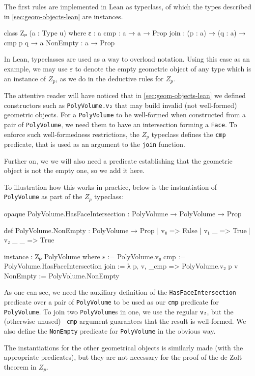 \documentclass[12pt]{article} %
\newcommand{\leanline}[1]{\texttt{#1}} %
\newcommand{\face}{\texttt{Face}} %
\newcommand{\pvolume}{\texttt{PolyVolume}} %
\newcommand{\zp}{\ensuremath{Z_{p}}}
\begin{document}
The first rules are implemented in Lean as typeclass, of which the types described in \cref{sec:geom-objects-lean} are instances. %
\begin{leancode}
class Zₚ (a : Type u) where
  ε : a
  cmp : a → a → Prop
  join : (p : a) → (q : a) → cmp p q → a
  NonEmpty : a → Prop
\end{leancode}

In Lean, typeclasses are used as a way to overload notation. %
Using this case as an example, we may use \(\varepsilon\) to denote the empty geometric object of any type which is an instance of \zp{}, as we do in the deductive rules for \zp{}. %

The attentive reader will have noticed that in \cref{sec:geom-objects-lean} we defined constructors such as \leanline{PolyVolume.v₂} that may build invalid (not well-formed) geometric objects. %
For a \pvolume{} to be well-formed when constructed from a pair of \pvolume, we need them to have an intersection forming a \face. %
To enforce such well-formedness restrictions, the \zp{} typeclass defines the \leanline{cmp} predicate, that is used as an argument to the \leanline{join} function. %

Further on, we we will also need a predicate establishing that the geometric object is not the empty one, so we add it here. %

To illustration how this works in practice, below is the instantiation of \pvolume{} as part of the \zp{} typeclass: %
\begin{leancode}
opaque PolyVolume.HasFaceIntersection
  : PolyVolume → PolyVolume → Prop

def PolyVolume.NonEmpty : PolyVolume → Prop
| v₀ => False
| v₁ _ => True
| v₂ _ _ => True

instance : Zₚ PolyVolume where
  ε := PolyVolume.v₀
  cmp := PolyVolume.HasFaceIntersection
  join := λ p, v, _cmp => PolyVolume.v₂ p v
  NonEmpty := PolyVolume.NonEmpty
\end{leancode}
As one can see, we need the auxiliary definition of the \leanline{HasFaceIntersection} predicate over a pair of \pvolume{} to be used as our \leanline{cmp} predicate for \pvolume. %
To join two \pvolume{}s in one, we use the regular \leanline{v₂}, but the (otherwise unused) \leanline{_cmp} argument guarantees that the result is well-formed. %
We also define the \leanline{NonEmpty} predicate for \pvolume{} in the obvious way. %

The instantiations for the other geometrical objects is similarly made (with the appropriate predicates), but they are not necessary for the proof of the de Zolt theorem in \zp. %
\end{document}
